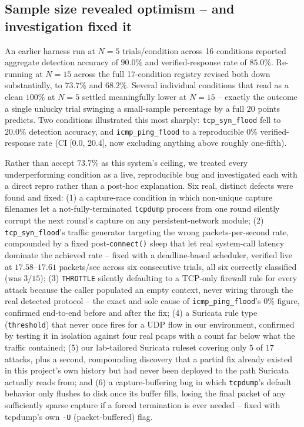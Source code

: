 \documentclass[conference]{IEEEtran}
\newcommand{\ci}[2]{[#1, #2]}
\begin{document}
\subsection{Sample size revealed optimism -- and investigation fixed it}
\label{sec:sizecorrection}

An earlier harness run at $N=5$ trials/condition across 16 conditions reported aggregate detection
accuracy of $90.0\%$ and verified-response rate of $85.0\%$. Re-running at $N=15$ across the full
17-condition registry revised both down substantially, to $73.7\%$ and $68.2\%$. Several individual
conditions that read as a clean $100\%$ at $N=5$ settled meaningfully lower at $N=15$ -- exactly the
outcome a single unlucky trial swinging a small-sample percentage by a full $20$ points predicts.
Two conditions illustrated this most sharply: \texttt{tcp\_syn\_flood} fell to $20.0\%$ detection
accuracy, and \texttt{icmp\_ping\_flood} to a reproducible $0\%$ verified-response rate (CI
\ci{0.0}{20.4}, now excluding anything above roughly one-fifth).

Rather than accept $73.7\%$ as this system's ceiling, we treated every underperforming condition as
a live, reproducible bug and investigated each with a direct repro rather than a post-hoc
explanation. Six real, distinct defects were found and fixed: (1) a capture-race condition in which
non-unique capture filenames let a not-fully-terminated \texttt{tcpdump} process from one round
silently corrupt the next round's capture on any persistent-network module; (2) \texttt{tcp\_syn\_flood}'s
traffic generator targeting the wrong packets-per-second rate, compounded by a fixed
post-\texttt{connect()} sleep that let real system-call latency dominate the achieved rate --
fixed with a deadline-based scheduler, verified live at $17.58$--$17.61$ packets/sec across six
consecutive trials, all six correctly classified (was $3/15$); (3) \texttt{THROTTLE} silently
defaulting to a TCP-only firewall rule for every attack because the caller populated an empty
context, never wiring through the real detected protocol -- the exact and sole cause of
\texttt{icmp\_ping\_flood}'s $0\%$ figure, confirmed end-to-end before and after the fix; (4) a
Suricata rule type (\texttt{threshold}) that never once fires for a UDP flow in our environment,
confirmed by testing it in isolation against four real pcaps with a count far below what the
traffic contained; (5) our lab-tailored Suricata ruleset covering only $5$ of $17$ attacks, plus a
second, compounding discovery that a partial fix already existed in this project's own history but
had never been deployed to the path Suricata actually reads from; and (6) a capture-buffering bug
in which \texttt{tcpdump}'s default behavior only flushes to disk once its buffer fills, losing the
final packet of any sufficiently sparse capture if a forced termination is ever needed -- fixed with
tcpdump's own \texttt{-U} (packet-buffered) flag.
\end{document}
